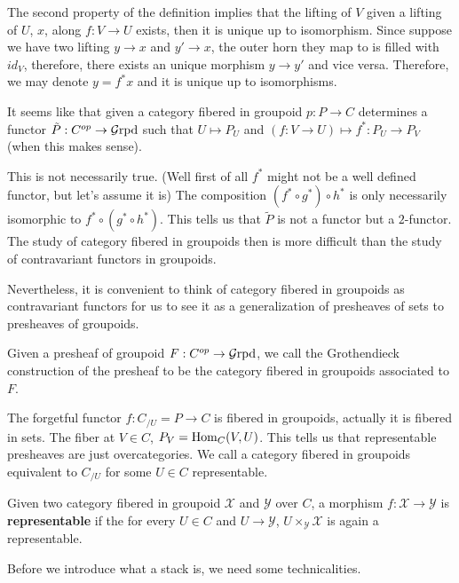 The second property of the definition implies that the lifting of $V$ given a lifting of $U$, $x$, along $f:V\to U$ exists, then it is unique up to isomorphism. Since suppose we have two lifting $y\to x$ and $y'\to x$, the outer horn they map to is filled with $id_V$, therefore, there exists an unique morphism $y\to y'$ and vice versa. Therefore, we may denote $y=f^*x$ and it is unique up to isomorphisms.

It seems like that given a category fibered in groupoid $p:P\to C$ determines a functor $\tilde P: C^{op}\to \operatorname{\mathcal{G}rpd}$ such that $U\mapsto P_U$ and $(f:V\to U)\mapsto f^*:P_U\to P_V$ (when this makes sense). 

This is not necessarily true. (Well first of all $f^*$ might not be a well defined functor, but let's assume it is) The composition $(f^*\circ g^*)\circ h^*$ is only necessarily isomorphic to $f^*\circ (g^*\circ h^*)$. This tells us that $\tilde{P}$ is not a functor but a $2$-functor. The study of category fibered in groupoids then is more difficult than the study of contravariant functors in groupoids.

Nevertheless, it is convenient to think of category fibered in groupoids as contravariant functors for us to see it as a generalization of presheaves of sets to presheaves of groupoids.

\begin{definition}
    Given a presheaf of groupoid $F:C^{op}\to \operatorname{\mathcal{G}rpd}$, we call the Grothendieck construction of the presheaf to be the category fibered in groupoids associated to $F$.
\end{definition}

\begin{example}
    The forgetful functor $f:C_{/U}=P\to C$ is fibered in groupoids, actually it is fibered in sets. The fiber at $V\in C$, $P_V=\operatorname{Hom}_C(V,U)$. This tells us that representable presheaves are just overcategories. We call a category fibered in groupoids equivalent to $C_{/U}$ for some $U\in C$ representable.
\end{example}

\begin{definition}
Given two category fibered in groupoid $\mathcal{X}$ and $\mathcal{Y}$ over $C$, a morphism $f:\mathcal{X\to Y}$ is \textbf{representable} if the for every $U\in C$ and $U\to \mathcal{Y}$, $U\times _\mathcal{Y}\mathcal{X}$ is again a representable.
\end{definition}

Before we introduce what a stack is, we need some technicalities.

